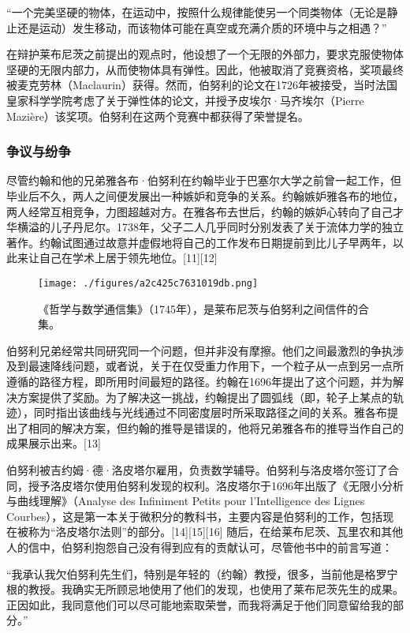 “一个完美坚硬的物体，在运动中，按照什么规律能使另一个同类物体（无论是静止还是运动）发生移动，而该物体可能在真空或充满介质的环境中与之相遇？”

在辩护莱布尼茨之前提出的观点时，他设想了一个无限的外部力，要求克服使物体坚硬的无限内部力，从而使物体具有弹性。因此，他被取消了竞赛资格，奖项最终被麦克劳林（Maclaurin）获得。然而，伯努利的论文在1726年被接受，当时法国皇家科学学院考虑了关于弹性体的论文，并授予皮埃尔·马齐埃尔（Pierre Mazière）该奖项。伯努利在这两个竞赛中都获得了荣誉提名。
\subsubsection{争议与纷争}
尽管约翰和他的兄弟雅各布·伯努利在约翰毕业于巴塞尔大学之前曾一起工作，但毕业后不久，两人之间便发展出一种嫉妒和竞争的关系。约翰嫉妒雅各布的地位，两人经常互相竞争，力图超越对方。在雅各布去世后，约翰的嫉妒心转向了自己才华横溢的儿子丹尼尔。1738年，父子二人几乎同时分别发表了关于流体力学的独立著作。约翰试图通过故意并虚假地将自己的工作发布日期提前到比儿子早两年，以此来让自己在学术上居于领先地位。[11][12]
\begin{figure}[ht] 
\centering
\texttt{[image: ./figures/a2c425c7631019db.png]}
\caption{《哲学与数学通信集》（1745年），是莱布尼茨与伯努利之间信件的合集。} \label{fig_YHBNL_2}
\end{figure}
伯努利兄弟经常共同研究同一个问题，但并非没有摩擦。他们之间最激烈的争执涉及到最速降线问题，或者说，关于在仅受重力作用下，一个粒子从一点到另一点所遵循的路径方程，即所用时间最短的路径。约翰在1696年提出了这个问题，并为解决方案提供了奖励。为了解决这一挑战，约翰提出了圆弧线（即，轮子上某点的轨迹），同时指出该曲线与光线通过不同密度层时所采取路径之间的关系。雅各布提出了相同的解决方案，但约翰的推导是错误的，他将兄弟雅各布的推导当作自己的成果展示出来。[13]

伯努利被吉约姆·德·洛皮塔尔雇用，负责数学辅导。伯努利与洛皮塔尔签订了合同，授予洛皮塔尔使用伯努利发现的权利。洛皮塔尔于1696年出版了《无限小分析与曲线理解》（Analyse des Infiniment Petits pour l'Intelligence des Lignes Courbes），这是第一本关于微积分的教科书，主要内容是伯努利的工作，包括现在被称为“洛皮塔尔法则”的部分。[14][15][16] 随后，在给莱布尼茨、瓦里农和其他人的信中，伯努利抱怨自己没有得到应有的贡献认可，尽管他书中的前言写道：

“我承认我欠伯努利先生们，特别是年轻的（约翰）教授，很多，当前他是格罗宁根的教授。我确实无所顾忌地使用了他们的发现，也使用了莱布尼茨先生的成果。正因如此，我同意他们可以尽可能地索取荣誉，而我将满足于他们同意留给我的部分。”
